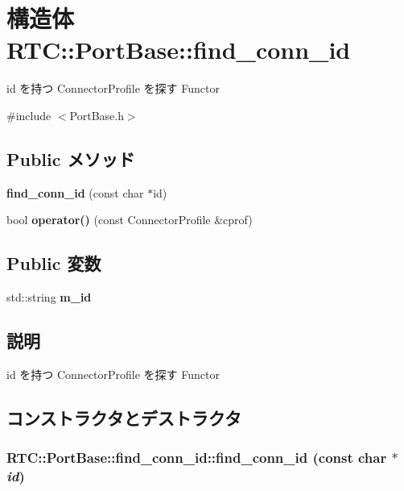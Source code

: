 \section{構造体 RTC::PortBase::find\_\-conn\_\-id}
\label{structRTC_1_1PortBase_1_1find__conn__id}


id を持つ ConnectorProfile を探す Functor  




{\ttfamily \#include $<$PortBase.h$>$}

\subsection*{Public メソッド}
\begin{DoxyCompactItemize}
\item 
{\bf find\_\-conn\_\-id} (const char $\ast$id)
\item 
bool {\bf operator()} (const ConnectorProfile \&cprof)
\end{DoxyCompactItemize}
\subsection*{Public 変数}
\begin{DoxyCompactItemize}
\item 
std::string {\bf m\_\-id}
\end{DoxyCompactItemize}


\subsection{説明}
id を持つ ConnectorProfile を探す Functor 

\subsection{コンストラクタとデストラクタ}
\subsubsection[{find\_\-conn\_\-id}]{\setlength{\rightskip}{0pt plus 5cm}RTC::PortBase::find\_\-conn\_\-id::find\_\-conn\_\-id (const char $\ast$ {\em id})\hspace{0.3cm}{\ttfamily  [inline]}}\label{structRTC_1_1PortBase_1_1find__conn__id_a0c5e57c7f8b1bf719135c52eed175223}


